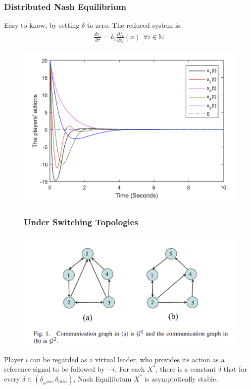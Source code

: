 \documentclass[notheorems, aspectratio=54]{beamer}
\begin{document}
\begin{frame}
  \frametitle{Distributed Nash Equilibrium}
  Easy to know, by setting $\delta$ to zero,  The reduced system is:
  \begin{gather}
    \frac{dx_i}{d\tau} = \bar{k}_i \frac{\partial f_i}{\partial x_i}(x) \ \  \forall i \in \mathbb{N}
  \end{gather}
  \begin{figure}[H]
    \centering
    \includegraphics[width=0.7\linewidth]{nash-eq.png}
  \end{figure}

\end{frame}
\begin{frame}
  \begin{figure}[H]
    \frametitle{Under Switching Topologies}
    \centering
    \includegraphics[height=0.4\linewidth]{nodes.png}
  \end{figure}
  Player $i$ can be regarded as a virtual leader, who provides its action as a reference signal to be followed by $-i$,   For each $X^*$, there is a constant $\delta$ that for every $\delta \in (\delta_{_max}, \delta_{min})$, Nash Equilibrium $X^*$ is asymptotically stable. \cite{8093754}
\end{frame}
\end{document}
